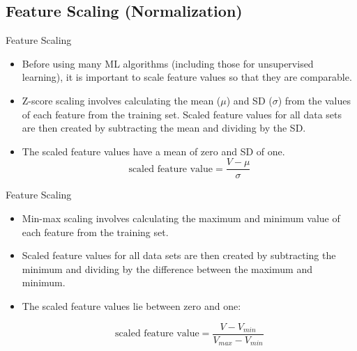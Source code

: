 \documentclass[11pt]{beamer}
\begin{document}
\subsection{Feature Scaling (Normalization) \\ \scalebox{0.8}{}}
%
%
\begin{frame}{Feature Scaling}
	\begin{itemize}
		\item Before using many ML algorithms (including those for unsupervised learning), it is important to scale feature values so that they are comparable.
		\item  Z-score scaling involves calculating the mean ($\mu$) and SD ($\sigma$) from the values of each feature from the training set. Scaled feature values for all data sets are then created by subtracting the mean and dividing by the SD. 
\item The scaled feature values have a mean of zero and SD of one.
		\begin{equation}
		\text{scaled feature value} = \frac{V-\mu}{\sigma}
		\end{equation}
	\end{itemize}
\end{frame}
%
%
\begin{frame}{Feature Scaling}
	\begin{itemize}
		\item Min-max scaling involves calculating the maximum and minimum value of each feature from the training set. 
		\item Scaled feature values for all data sets are then created by subtracting the minimum and dividing by the difference between the maximum and minimum. 
		\item The scaled feature values lie between zero and one:
		
				\begin{equation}
		\text{scaled feature value} = \frac{V-V_{min}}{V_{max}-V_{min}}
		\end{equation}
	\end{itemize}
\end{frame}
\end{document}
